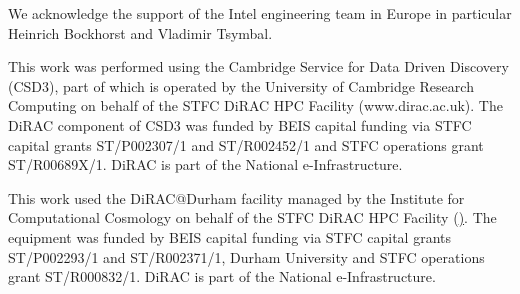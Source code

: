 
We acknowledge the support of the Intel engineering team in Europe in particular Heinrich Bockhorst and Vladimir Tsymbal.

This work was performed using the Cambridge Service for Data Driven Discovery (CSD3), part of which is operated by the University of Cambridge Research Computing on behalf of the STFC DiRAC HPC Facility (www.dirac.ac.uk). The DiRAC component of CSD3 was funded by BEIS capital funding via STFC capital grants ST/P002307/1 and ST/R002452/1 and STFC operations grant ST/R00689X/1. DiRAC is part of the National e-Infrastructure.

This work used the DiRAC@Durham facility managed by the Institute for Computational Cosmology on behalf of the STFC DiRAC HPC Facility (\href{https://www.dirac.ac.uk/}). The equipment was funded by BEIS capital funding via STFC capital grants ST/P002293/1 and ST/R002371/1, Durham University and STFC operations grant ST/R000832/1. DiRAC is part of the National e-Infrastructure.

